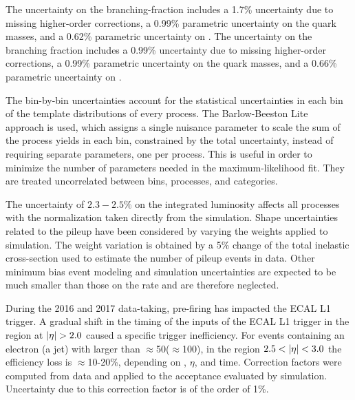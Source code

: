 The uncertainty on the \Htt branching-fraction includes a 1.7\% uncertainty due to missing higher-order corrections, a 0.99\% parametric uncertainty on the quark masses, and a 0.62\% parametric uncertainty on \as. The uncertainty on the \HWW branching fraction includes a 0.99\% uncertainty due to missing higher-order corrections, a 0.99\% parametric uncertainty on the quark masses, and a 0.66\% parametric uncertainty on \as.

The bin-by-bin uncertainties account for the statistical uncertainties in each bin of the template distributions of every process. The Barlow-Beeston Lite ~\cite{Conway:2011in, Barlow:1993dm} approach is used, which assigns a single nuisance parameter to scale the sum of the process yields in each bin, constrained by the total uncertainty, instead of requiring separate parameters, one per process. This is useful in order to minimize the number of parameters needed in the maximum-likelihood fit. They are treated uncorrelated between bins, processes, and categories.

The uncertainty of $2.3-2.5\%$ on the integrated luminosity affects all processes with the normalization taken directly from the simulation. Shape uncertainties related to the pileup have been considered by varying the weights applied to simulation. The weight variation is obtained by a 5\% change of the total inelastic cross-section used to estimate the number of pileup events in data. Other minimum bias event modeling and simulation uncertainties are expected to be much smaller than those on the rate and are therefore neglected.

During the 2016 and 2017 data-taking, pre-firing has impacted the ECAL L1 trigger. A gradual shift in the timing of the inputs of the ECAL L1 trigger in the region at $\lvert\eta\rvert > 2.0$ caused a specific trigger inefficiency. For events containing an electron (a jet) with \pt larger than $\approx$50\GeV ($\approx$100\GeV), in the region $2.5 < \lvert\eta\rvert < 3.0$ the efficiency loss is $\approx$10-20\%, depending on \pt, $\eta$, and time. Correction factors were computed from data and applied to the acceptance evaluated by simulation. Uncertainty due to this correction factor is of the order of 1\%.
